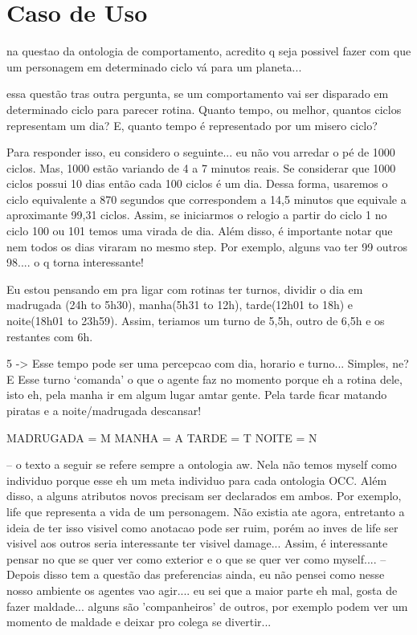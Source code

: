 \chapter{Caso de Uso} \label{ch:cdu}


na questao da ontologia de comportamento, acredito q seja possivel
fazer com que um personagem em determinado ciclo vá para um
planeta...

essa questão tras outra pergunta, se um comportamento vai ser
disparado em determinado ciclo para parecer rotina. Quanto tempo,
ou melhor, quantos ciclos representam um dia? E, quanto tempo
é representado por um misero ciclo?

Para responder isso, eu considero o seguinte... eu não vou arredar o
pé de 1000 ciclos. Mas, 1000 estão variando de 4 a 7 minutos reais.
Se considerar que 1000 ciclos possui 10 dias então cada 100 ciclos é um dia.
Dessa forma, usaremos o ciclo equivalente a 870 segundos que correspondem
a 14,5 minutos que equivale a aproximante 99,31 ciclos. Assim, se iniciarmos
o relogio a partir do ciclo 1 no ciclo 100 ou 101 temos uma virada de dia.
Além disso, é importante notar que nem todos os dias viraram no mesmo step.
Por exemplo, alguns vao ter 99 outros 98.... o q torna interessante!

Eu estou pensando em pra ligar com rotinas ter turnos, dividir o dia em
madrugada (24h to 5h30), manha(5h31 to 12h), tarde(12h01 to 18h) e
noite(18h01 to 23h59). Assim, teriamos um turno de 5,5h, outro de 6,5h e os
restantes com 6h.

5 -> Esse tempo pode ser uma percepcao com dia, horario e turno... Simples,
ne?
       E Esse turno `comanda' o que o agente faz no momento porque eh a rotina
       dele, isto eh, pela manha ir em algum lugar amtar gente. Pela tarde
ficar
       matando piratas e a noite/madrugada descansar!

MADRUGADA = M
MANHA = A
TARDE = T
NOITE = N

--
o texto a seguir se refere sempre a ontologia aw.
Nela não temos myself como individuo porque esse
eh um meta individuo para cada ontologia OCC.
Além disso, a alguns atributos novos precisam ser
declarados em ambos. Por exemplo, life que representa
a vida de um personagem. Não existia ate agora,
entretanto a ideia de ter isso visivel como anotacao
pode ser ruim, porém ao inves de life ser visivel aos
outros seria interessante ter visivel damage...
Assim, é interessante pensar no que se quer ver
como exterior e o que se quer ver como myself....
--
Depois disso tem a questão das preferencias ainda,
eu não pensei como nesse nosso ambiente os agentes
vao agir.... eu sei que a maior parte eh mal, gosta de
fazer maldade... alguns são 'companheiros' de outros,
por exemplo podem ver um momento de maldade e
deixar pro colega se divertir...

